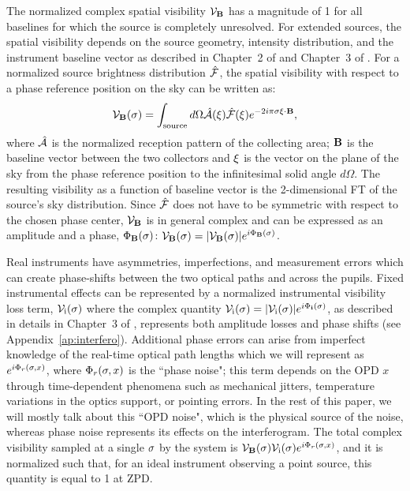 The normalized complex spatial visibility $\mathcal{V}_{\mathbf{B}}$ has a magnitude of 1 for all baselines for which the source is completely unresolved. For extended sources, the spatial visibility depends on the source geometry, intensity distribution, and the instrument baseline vector as described in Chapter~2 of \citep{Lawson:2000vf} 
and Chapter~3 of \cite{Thompson:2008ww}.  
For a normalized source brightness distribution $\hat{\mathcal{F}}$, the spatial visibility with respect to a phase reference position on the sky can be written as:
\begin{equation}
\mathcal{V}_{\mathbf{B}}(\sigma)  =  \int_\textrm{source} d\Omega \hat{\mathcal{A}}(\xi) \hat{\mathcal{F}}(\xi ) e^{-2i\pi\sigma\xi\cdot \mathbf{B}},
\label{eq:viseq}
\end{equation}
where $\hat{\mathcal{A}}$ is the normalized reception pattern of the collecting area; $\mathbf{B}$ is the baseline vector between the two collectors and $\xi$ is the vector on the plane of the sky from the phase reference position to the infinitesimal solid angle $d\Omega$. The resulting visibility as a function of baseline vector is the 2-dimensional FT of the source's sky distribution. 
Since $\hat{\mathcal{F}}$ does not have to be symmetric with respect to the chosen phase center, $\mathcal{V}_{\mathbf{B}}$ is in general complex and can be expressed as an amplitude and a phase, $\Phi_\mathbf{B}(\sigma)$: $\mathcal{V}_{\mathbf{B}}(\sigma)  =  |\mathcal{V}_{\mathbf{B}}(\sigma)|e^{i\Phi_\mathbf{B}(\sigma)} $.



Real instruments have asymmetries, imperfections, and measurement errors which can create phase-shifts between the two optical paths and across the pupils.
Fixed instrumental effects 
can be represented by a normalized instrumental visibility loss term, 
$\mathcal{V}_\textrm{i}(\sigma)$ where the complex quantity $\mathcal{V}_\textrm{i}(\sigma) = |\mathcal{V}_\textrm{i}(\sigma)|e^{i\Phi_\mathbf{i}(\sigma)}$, as described in details in Chapter~3 of \cite{2000plbs.conf.....L}, represents both amplitude losses and phase shifts (see Appendix~\ref{ap:interfero}). Additional phase errors can arise from
imperfect knowledge of the real-time optical path lengths which we will represent as
$e^{i\Phi_r(\sigma, x)}$, where $\Phi_r(\sigma, x)$ is the ``phase noise"; this term depends on the OPD $x$ through time-dependent phenomena such as mechanical jitters, temperature variations in
the optics support, or pointing errors. In the rest of this paper, we will mostly talk about this ``OPD noise", which is the physical source of the noise, whereas phase noise represents its effects on the interferogram.
The total complex visibility sampled at a single $\sigma$ by the system is $\mathcal{V}_{\mathbf{B}}(\sigma)\mathcal{V}_\textrm{i}(\sigma) e^{i\Phi_r(\sigma, x)}$, and it is normalized such that, for an ideal instrument observing a point source, this quantity is equal to 1 at ZPD.

